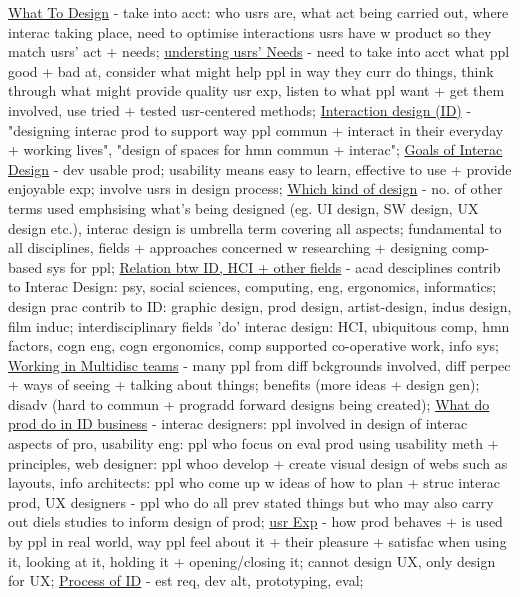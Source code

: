 \documentclass[a4paper]{article}
\begin{document}
\begin{multicols}{3}
        \underline{What To Design} - take into acct: who usrs are, what act being carried out, where interac taking place, need to optimise interactions usrs have w product so they match usrs' act + needs;
        \underline{understing usrs' Needs} - need to take into acct what ppl good + bad at, consider what might help ppl in way they curr do things, think through what
        might provide quality usr exp, listen to what ppl want + get them involved, use tried + tested usr-centered methods;
        \underline{Interaction design (ID)} - "designing interac prod to support way ppl commun + interact in their everyday + working lives", "design of spaces for hmn commun + interac";
        \underline{Goals of Interac Design} - dev usable prod; usability means easy to learn, effective to use + provide enjoyable exp; involve usrs in design process;
        \underline{Which kind of design} - no. of other terms used emphsising what's being designed (eg. UI design, SW design, UX design etc.), interac design is umbrella term covering all aspects;
        fundamental to all disciplines, fields + approaches concerned w researching + designing comp-based sys for ppl;
        \underline{Relation btw ID, HCI + other fields} - acad desciplines contrib to Interac Design: psy, social sciences, computing, eng, ergonomics, informatics;
        design prac contrib to ID: graphic design, prod design, artist-design, indus design, film induc; interdisciplinary fields 'do' interac design: HCI, ubiquitous comp, hmn factors, cogn eng,
        cogn ergonomics, comp supported co-operative work, info sys;
        \underline{Working in Multidisc teams} - many ppl from diff bckgrounds involved, diff perpec + ways of seeing + talking about things; benefits (more ideas + design gen); disadv (hard to commun
        + progradd forward designs being created);
        \underline{What do prod do in ID business} - interac designers: ppl involved in design of interac aspects of pro, usability eng: ppl who focus on eval prod
        using usability meth + principles, web designer: ppl whoo develop + create visual design of webs such as layouts, info architects: ppl who come up w ideas of how to plan +
        struc interac prod, UX designers - ppl who do all prev stated things but who may also carry out diels studies to inform design of prod;
        \underline{usr Exp} - how prod behaves + is used by ppl in real world, way ppl feel about it + their pleasure + satisfac when using it, looking at it, holding it + opening/closing it;
        cannot design UX, only design for UX;
        \underline{Process of ID} - est req, dev alt, prototyping, eval;

\end{multicols}
\end{document}
